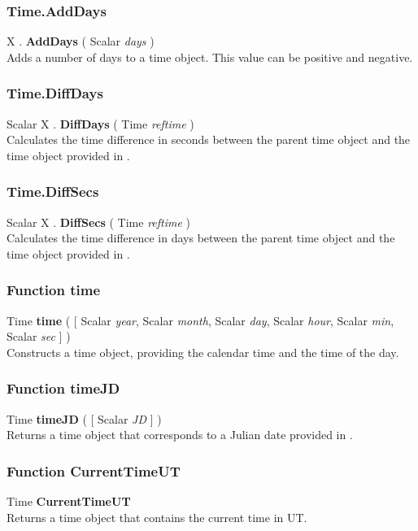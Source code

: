 \subsubsection{Time.AddDays \label{F:Time:AddDays}}
X . \textbf{AddDays} ( Scalar \textit{days} ) \\
Adds a number of days to a time object. This value can be positive and negative.

\subsubsection{Time.DiffDays \label{F:Time:DiffDays}}
Scalar X . \textbf{DiffDays} ( Time \textit{reftime} ) \\
Calculates the time difference in seconds between the parent time object and the time object provided in .

\subsubsection{Time.DiffSecs \label{F:Time:DiffSecs}}
Scalar X . \textbf{DiffSecs} ( Time \textit{reftime} ) \\
Calculates the time difference in days between the parent time object and the time object provided in .


\subsubsection{Function time \label{F:time}}
Time \textbf{time} (  [ Scalar \textit{year}, Scalar \textit{month}, Scalar \textit{day}, Scalar \textit{hour}, Scalar \textit{min}, Scalar \textit{sec} ] ) \\
Constructs a time object, providing the calendar time and the time of the day.

\subsubsection{Function timeJD \label{F:timeJD}}
Time \textbf{timeJD} (  [ Scalar \textit{JD} ] ) \\
Returns a time object that corresponds to a Julian date provided in .

\subsubsection{Function CurrentTimeUT \label{F:CurrentTimeUT}}
Time \textbf{CurrentTimeUT} \\
Returns a time object that contains the current time in UT.

